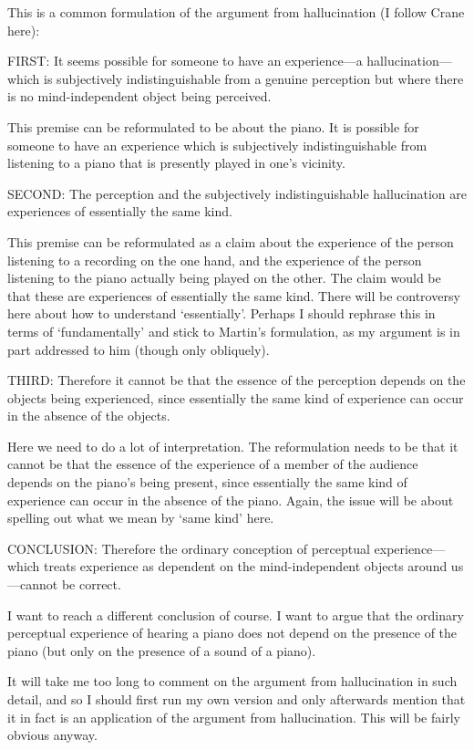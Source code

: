 \documentclass[sloppy, journal, git, bytitle, dodraft]{humapap}
\begin{document}
This is a common formulation of the argument from hallucination (I follow Crane here): 

FIRST: It seems possible for someone to have an experience—a hallucination—which is subjectively indistinguishable from a genuine perception but where there is no mind-independent object being perceived.

This premise can be reformulated to be about the piano. It is possible for someone to have an experience which is subjectively indistinguishable from listening to a piano that is presently played in one's vicinity. 

SECOND: The perception and the subjectively indistinguishable hallucination are experiences of essentially the same kind.

This premise can be reformulated as a claim about the experience of the person listening to a recording on the one hand, and the experience of the person listening to the piano actually being played on the other. The claim would be that these are experiences of essentially the same kind. There will be controversy here about how to understand `essentially'. Perhaps I should rephrase this in terms of `fundamentally' and stick to Martin's formulation, as my argument is in part addressed to him (though only obliquely).

THIRD: Therefore it cannot be that the essence of the perception depends on the objects being experienced, since essentially the same kind of experience can occur in the absence of the objects.

Here we need to do a lot of interpretation. The reformulation needs to be that it cannot be that the essence of the experience of a member of the audience depends on the piano's being present, since essentially the same kind of experience can occur in the absence of the piano. Again, the issue will be about spelling out what we mean by `same kind' here.

CONCLUSION: Therefore the ordinary conception of perceptual experience—which treats experience as dependent on the mind-independent objects around us—cannot be correct.

I want to reach a different conclusion of course. I want to argue that the ordinary perceptual experience of hearing a piano does not depend on the presence of the piano (but only on the presence of a sound of a piano). 

It will take me too long to comment on the argument from hallucination in such detail, and so I should first run my own version and only afterwards mention that it in fact is an application of the argument from hallucination. This will be fairly obvious anyway.
\end{document}
